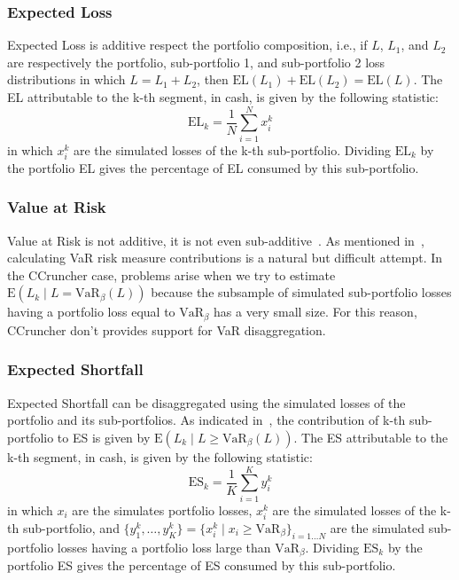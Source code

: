 \documentclass[11pt,fleqn]{book} %
\begin{document}
\subsubsection{Expected Loss}
Expected Loss is additive respect the portfolio composition, i.e., if 
$L$, $L_1$, and $L_2$ are respectively the portfolio, sub-portfolio 1, 
and sub-portfolio 2 loss distributions in which $L=L_1+L_2$, then 
$\text{EL}(L_1) + \text{EL}(L_2) = \text{EL}(L)$. The EL attributable
to the k-th segment, in cash, is given by the following statistic:
\begin{displaymath}
	\text{EL}_k = \frac{1}{N} \displaystyle \sum_{i=1}^{N} x_i^k
\end{displaymath}
in which $x_i^k$ are the simulated losses of the k-th sub-portfolio.
Dividing $\text{EL}_k$ by the portfolio EL gives the percentage of EL 
consumed by this sub-portfolio.

\subsubsection{Value at Risk}
Value at Risk is not additive, it is not even sub-additive~\cite{var:varbad}.
As mentioned in~\cite[chap. 5.2.2]{bluhm:2002}, calculating VaR risk 
measure contributions is a natural but difficult attempt. In the CCruncher 
case, problems arise when we try to estimate 
$\text{E}\left(L_k \mid L = \text{VaR}_{\beta}(L)\right)$ because the subsample
of simulated sub-portfolio losses having a portfolio loss equal to 
$\text{VaR}_{\beta}$ has a very small size. For this reason, CCruncher 
don't provides support for VaR disaggregation.

\subsubsection{Expected Shortfall}
Expected Shortfall can be disaggregated using the simulated losses of the 
portfolio and its sub-portfolios. As indicated 
in~\cite[chap. 5.2.3]{bluhm:2002}, the contribution of k-th sub-portfolio to 
ES is given by $\text{E}\left(L_k \mid L \ge \text{VaR}_{\beta}(L)\right)$.
The ES attributable to the k-th segment, in cash, is given by the 
following statistic:
\begin{displaymath}
	\text{ES}_k = \frac{1}{K} \displaystyle \sum_{i=1}^{K} y_i^k
\end{displaymath}
in which $x_i$ are the simulates portfolio losses, $x_i^k$ are the simulated 
losses of the k-th sub-portfolio, and
$\{y_1^k,\dots,y_K^k\} = \{x_i^k \mid x_i \ge \text{VaR}_{\beta}\}_{i=1\dots N}$ 
are the simulated sub-portfolio losses having a portfolio loss large than 
$\text{VaR}_{\beta}$.
Dividing $\text{ES}_k$ by the portfolio ES gives the percentage of ES 
consumed by this sub-portfolio.
\end{document}
